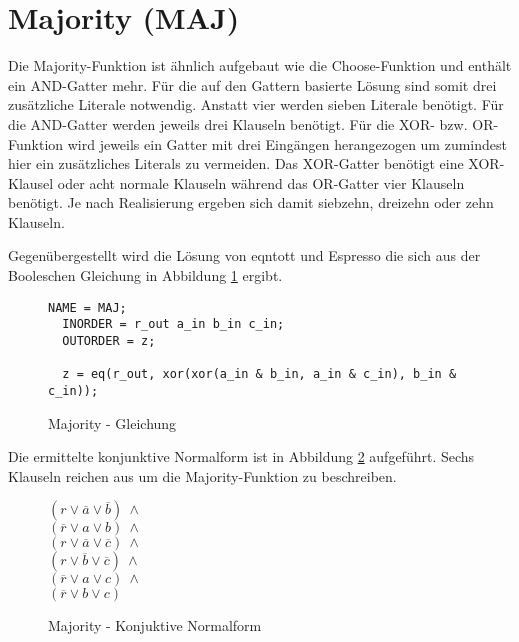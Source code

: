 \section{Majority (MAJ)}
\label{sec:knf:maj}

Die Majority-Funktion ist ähnlich aufgebaut wie die Choose-Funktion und enthält ein AND-Gatter mehr. Für die auf den Gattern basierte Lösung sind somit drei zusätzliche
Literale notwendig. Anstatt vier werden sieben Literale benötigt. Für die AND-Gatter werden jeweils drei Klauseln benötigt. Für die XOR- bzw. OR-Funktion wird jeweils
ein Gatter mit drei Eingängen herangezogen um zumindest hier ein zusätzliches Literals zu vermeiden. Das XOR-Gatter benötigt eine XOR-Klausel oder acht normale Klauseln
während das OR-Gatter vier Klauseln benötigt. Je nach Realisierung ergeben sich damit siebzehn, dreizehn oder zehn Klauseln.

Gegenübergestellt wird die Lösung von eqntott und Espresso die sich aus der Booleschen Gleichung in Abbildung \ref{fig:majority_eqn} ergibt.
\begin{figure}[!h]
  \centering
  \begin{lstlisting}[]
  NAME = MAJ;
  INORDER = r_out a_in b_in c_in;
  OUTORDER = z;

  z = eq(r_out, xor(xor(a_in & b_in, a_in & c_in), b_in & c_in));
  \end{lstlisting}
  \caption{Majority - Gleichung}
  \label{fig:majority_eqn}
\end{figure}

Die ermittelte konjunktive Normalform ist in Abbildung \ref{fig:majority_cnf} aufgeführt.
Sechs Klauseln reichen aus um die Majority-Funktion zu beschreiben.
\begin{figure}[!h]
  \centering
  \begin{minipage}[l]{2cm}
    $ (r \vee \overline{a} \vee \overline{b}) ~ \wedge $\\
    $ (\overline{r} \vee a \vee b) ~ \wedge $\\
    $ (r \vee \overline{a} \vee \overline{c}) ~ \wedge $\\
    $ (r \vee \overline{b} \vee \overline{c}) ~ \wedge $\\
    $ (\overline{r} \vee a \vee c) ~ \wedge $\\
    $ (\overline{r} \vee b \vee c) $
  \end{minipage}
  \caption{Majority - Konjuktive Normalform}
  \label{fig:majority_cnf}
\end{figure}

